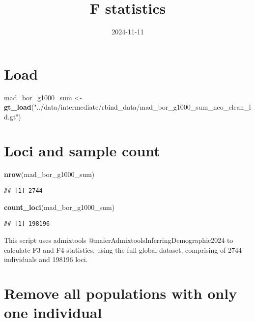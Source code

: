 \documentclass[
]{article}
\title{F statistics}
\author{}
\date{\vspace{-2.5em}2024-11-11}
\newenvironment{Shaded}{\begin{snugshade}}{\end{snugshade}}
\newcommand{\FunctionTok}[1]{\textcolor[rgb]{0.13,0.29,0.53}{\textbf{#1}}}
\newcommand{\NormalTok}[1]{#1}
\newcommand{\OtherTok}[1]{\textcolor[rgb]{0.56,0.35,0.01}{#1}}
\newcommand{\StringTok}[1]{\textcolor[rgb]{0.31,0.60,0.02}{#1}}
\begin{document}
\maketitle

\section{Load}\label{load}

\begin{Shaded}
\begin{Highlighting}[]
\NormalTok{mad\_bor\_g1000\_sum }\OtherTok{\textless{}{-}}
  \FunctionTok{gt\_load}\NormalTok{(}\StringTok{"../data/intermediate/rbind\_data/mad\_bor\_g1000\_sum\_neo\_clean\_ld.gt"}\NormalTok{)}
\end{Highlighting}
\end{Shaded}

\section{Loci and sample count}\label{loci-and-sample-count}

\begin{Shaded}
\begin{Highlighting}[]
\FunctionTok{nrow}\NormalTok{(mad\_bor\_g1000\_sum)}
\end{Highlighting}
\end{Shaded}

\begin{verbatim}
## [1] 2744
\end{verbatim}

\begin{Shaded}
\begin{Highlighting}[]
\FunctionTok{count\_loci}\NormalTok{(mad\_bor\_g1000\_sum)}
\end{Highlighting}
\end{Shaded}

\begin{verbatim}
## [1] 198196
\end{verbatim}

This script uses admixtools @maierAdmixtoolsInferringDemographic2024 to
calculate F3 and F4 statistics, using the full global dataset,
comprising of 2744 individuals and 198196 loci.

\section{Remove all populations with only one
individual}\label{remove-all-populations-with-only-one-individual}
\end{document}
